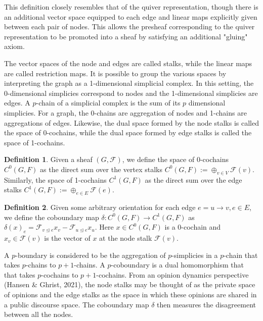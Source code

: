 \documentclass{article}
\theoremstyle{definition}
\newtheorem{definition}{Definition}[section]
\begin{document}
This definition closely resembles that of the quiver representation, though there is an additional vector space equipped to each edge and linear maps explicitly given between each pair of nodes.
This allows the presheaf corresponding to the quiver representation to be promoted into a sheaf by satisfying an additional "gluing" axiom.

The vector spaces of the node and edges are called stalks, while the linear maps are called restriction maps. It is possible to group the various spaces by interpreting the graph as a 1-dimensional simplicial complex. In this setting, the 0-dimensional simplicies correspond to nodes and the 1-dimensional simplicies are edges. A $p$-chain of a simplicial complex is the sum of its $p$ dimensional simplicies. For a graph, the 0-chains are aggregation of nodes and 1-chains are aggregations of edges. Likewise, the dual space formed by the node stalks is called the space of 0-cochains, while the dual space formed by edge stalks is called the space of 1-cochains.  

\begin{definition}
    Given a sheaf $(G, \mathcal{F})$, we define the space
of $0$-cochains $C^0(G, F)$ as the direct sum over the vertex
stalks $C^0 (G, F) := \oplus_{v\in V} \mathcal{F}(v)$. Similarly, the space of 1-cochains $C^1(G, F)$ as the direct sum over the edge stalks $C^1(G, F) := \oplus_{e\in E} \mathcal{F}(e)$.
\end{definition}

\begin{definition}
    Given some arbitrary orientation for each edge $e = u \to v, e \in E$, we define the coboundary map $\delta : C^0 (G, F) \to C^1(G, F)$ as $\delta(x)_e = \mathcal{F}_{v \unlhd e} x_v - \mathcal{F}_{u \unlhd e} x_u$.
    Here $x \in C^0(G, F)$ is a 0-cochain and $x_v \in \mathcal{F}(v)$ is the vector of $x$ at the node stalk $\mathcal{F}(v)$.
\end{definition}


A $p$-boundary is considered to be the aggregation of $p$-simplicies in a $p$-chain that takes $p$-chains to $p+1$-chains. A $p$-coboundary is a dual homomorphism that that takes $p$-cochains to $p+1$-cochains.  From an opinion dynamics perspective (Hansen \& Ghrist, 2021), the node stalks may be thought of as the private space of opinions and the edge stalks as the space in which these opinions are shared in a public discourse space. The coboundary map $\delta$ then measures the disagreement between all the nodes. 
\end{document}
